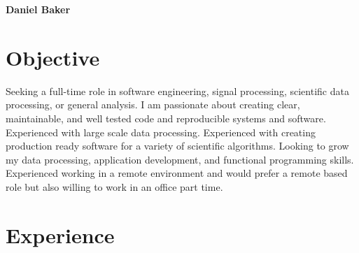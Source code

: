 



\textbf{\Huge Daniel Baker}
\begin{profile}
\end{profile}

\section{Objective}

\begin{blockquote}
    Seeking a full-time role in software engineering, signal processing, scientific data processing, or general analysis.
    I am passionate about creating clear, maintainable, and well tested code and reproducible systems and software.
    Experienced with large scale data processing.
    Experienced with creating production ready software for a variety of scientific algorithms.
    Looking to grow my data processing, application development, and functional programming skills.
    Experienced working in a remote environment and would prefer a remote based role but also willing to work in an office part time.
\end{blockquote}

\section{Experience}

